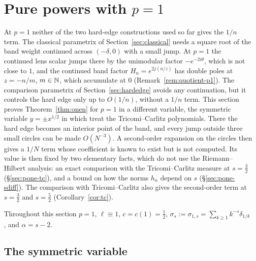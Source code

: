 
\section{\texorpdfstring{Pure powers with $p=1$}{Pure powers with p=1}}\label{sec:pone}

At $p=1$ neither of the two hard-edge constructions used so far gives the $1/n$ term. The classical parametrix of
Section~\ref{sec:classical} needs a square root of the band weight continued across $(-\delta,0)$ with a small jump.
At $p=1$ the continued lens scalar jumps there by the unimodular factor $-e^{-2i\theta}$, which is not close to $1$,
and the continued band factor $H_n=e^{2j(n/z)}$ has double poles at $z=-n/m$, $m\in\mathbb{N}$, which accumulate at $0$
(Remark~\ref{rem:quotient-p1}). The comparison parametrix of Section~\ref{sec:hardedge} avoids any continuation, but it
controls the hard edge only up to $O(1/n)$, without a $1/n$ term. This section proves Theorem~\ref{thm:onen} for $p=1$
in a different variable, the symmetric variable $y=\pm x^{1/2}$ in which \cite{WLXZ} treat the Tricomi--Carlitz
polynomials. There the hard edge becomes an interior point of the band, and every jump outside three small circles can
be made $O(N^{-3})$. A second-order expansion on the circles then gives a $1/N$ term whose coefficient is known to exist
but is not computed. Its value is then fixed by two elementary facts, which do not use the Riemann--Hilbert analysis: an
exact comparison with the Tricomi--Carlitz measure at $s=\frac32$ (\S\ref{sec:pone-tc}), and a bound on how the norms
$h_n$ depend on $s$ (\S\ref{sec:pone-sdiff}). The comparison with Tricomi--Carlitz also gives the second-order term at
$s=\frac32$ and $s=\frac52$ (Corollary~\ref{cor:tc}).

Throughout this section $p=1$, $\ell\equiv1$, $c=c(1)=\frac12$, $\sigma_s:=\sigma_{1,s}=\sum_{k\ge1}k^{-s}\delta_{1/k}$, and
$\alpha=s-2$.

\subsection{The symmetric variable}\label{sec:pone-sym}

